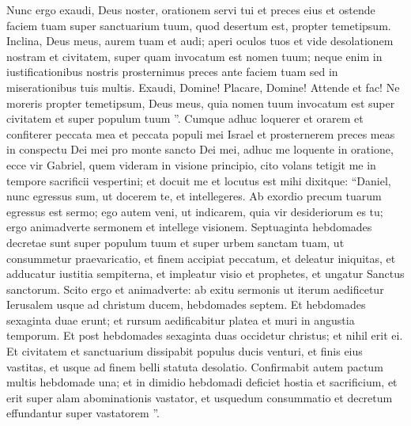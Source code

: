 \begin{biblechapter}
\begin{biblechapter}
\begin{biblechapter}
\begin{biblechapter}
\begin{biblechapter}
\begin{biblechapter}
\begin{biblechapter}
\begin{biblechapter}
\begin{biblechapter}
 \verse Nunc ergo exaudi, Deus noster, orationem servi tui et preces eius et ostende faciem tuam super sanctuarium tuum, quod desertum est, propter temetipsum. 
 \verse Inclina, Deus meus, aurem tuam et audi; aperi oculos tuos et vide desolationem nostram et civitatem, super quam invocatum est nomen tuum; neque enim in iustificationibus nostris prosternimus preces ante faciem tuam sed in miserationibus tuis multis. 
\verse Exaudi, Domine! Placare, Domine! Attende et fac! Ne moreris propter temetipsum, Deus meus, quia nomen tuum invocatum est super civitatem et super populum tuum ”.
 \verse Cumque adhuc loquerer et orarem et confiterer peccata mea et peccata populi mei Israel et prosternerem preces meas in conspectu Dei mei pro monte sancto Dei mei, 
\verse adhuc me loquente in oratione, ecce vir Gabriel, quem videram in visione principio, cito volans tetigit me in tempore sacrificii vespertini; 
 \verse et docuit me et locutus est mihi dixitque: “Daniel, nunc egressus sum, ut docerem te, et intellegeres. 
\verse Ab exordio precum tuarum egressus est sermo; ego autem veni, ut indicarem, quia vir desideriorum es tu; ergo animadverte sermonem et intellege visionem.
 \verse Septuaginta hebdomades decretae sunt
 super populum tuum et super urbem sanctam tuam,
 ut consummetur praevaricatio,
 et finem accipiat peccatum,
 et deleatur iniquitas,
 et adducatur iustitia sempiterna,
 et impleatur visio et prophetes,
 et ungatur Sanctus sanctorum.
 \verse Scito ergo et animadverte:
 ab exitu sermonis
 ut iterum aedificetur Ierusalem
 usque ad christum ducem,
 hebdomades septem.
 Et hebdomades sexaginta duae erunt;
 et rursum aedificabitur platea et muri
 in angustia temporum.
 \verse Et post hebdomades sexaginta duas
 occidetur christus;
 et nihil erit ei.
 Et civitatem et sanctuarium dissipabit
 populus ducis venturi,
 et finis eius vastitas,
 et usque ad finem belli
 statuta desolatio.
 \verse Confirmabit autem pactum multis
 hebdomade una;
 et in dimidio hebdomadi
 deficiet hostia et sacrificium,
 et erit super alam abominationis vastator,
 et usquedum consummatio et decretum
 effundantur super vastatorem ”.
 

\end{biblechapter}
\end{biblechapter}
\end{biblechapter}
\end{biblechapter}
\end{biblechapter}
\end{biblechapter}
\end{biblechapter}
\end{biblechapter}
\end{biblechapter}
